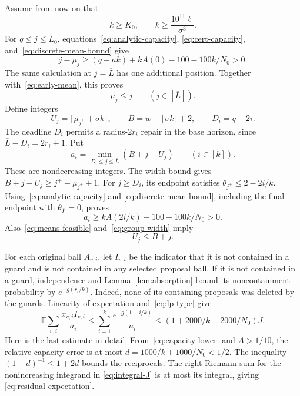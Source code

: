 \documentclass[11pt]{article}
\numberwithin{equation}{section}
\theoremstyle{definition}
\newcommand{\E}{\mathbb E}
\newcommand{\cL}{\overline L}
\begin{document}
Assume from now on that
\begin{equation}\label{eq:large-regime}
 k\ge K_0,\qquad k\ge\frac{10^{11}\ell}{\sigma^3}.
\end{equation}
For $q\le j\le L_0$, equations~\eqref{eq:analytic-capacity},
\eqref{eq:cert-capacity}, and~\eqref{eq:discrete-mean-bound} give
\[
 j-\mu_j\ge(q-ak)+kA(0)-100-100k/N_0>0.
\]
The same calculation at $j=\cL$ has one additional position.
Together with~\eqref{eq:early-mean}, this proves
\begin{equation}\label{eq:means-feasible}
 \mu_j\le j\qquad(j\in[\cL]).
\end{equation}
Define integers
\begin{equation}\label{eq:U-B}
 U_j=\lceil\mu_{j^+}+\sigma k\rceil,\qquad
 B=w+\lceil\sigma k\rceil+2,\qquad D_i=q+2i.
\end{equation}
The deadline $D_i$ permits a radius-$2r_i$ repair in the base horizon,
since $\cL-D_i=2r_i+1$. Put
\begin{equation}\label{eq:integer-capacities}
 a_i=\min_{D_i\le j\le\cL}(B+j-U_j)\qquad(i\in[k]).
\end{equation}
These are nondecreasing integers. The width bound gives
$B+j-U_j\ge j^+-\mu_{j^+}+1$.
For $j\ge D_i$, its endpoint satisfies
$\theta_{j^+}\le2-2i/k$. Using~\eqref{eq:analytic-capacity} and
\eqref{eq:discrete-mean-bound}, including the final endpoint with
$\theta_{\cL}=0$, proves
\begin{equation}\label{eq:capacity-lower}
 a_i\ge kA(2i/k)-100-100k/N_0>0.
\end{equation}
Also~\eqref{eq:means-feasible} and~\eqref{eq:group-width} imply
\begin{equation}\label{eq:U-feasible}
 U_j\le B+j.
\end{equation}

For each original ball $A_{v,i}$, let $I_{v,i}$ be the indicator that it
is not contained in a guard and is not contained in any selected
proposal ball. If it is not contained in a guard, independence and
Lemma~\ref{lem:absorption} bound its noncontainment probability by
$e^{-g(r_i/k)}$. Indeed, none of its containing proposals was deleted
by the guards. Linearity of expectation and~\eqref{eq:lp-type} give
\begin{equation}\label{eq:residual-expectation}
 \E\sum_{v,i}\frac{x_{v,i}I_{v,i}}{a_i}
 \le\sum_{i=1}^k\frac{e^{-g(1-i/k)}}{a_i}
 \le(1+2000/k+2000/N_0)J.
\end{equation}
Here is the last estimate in detail. From~\eqref{eq:capacity-lower}
and $A>1/10$, the relative capacity error is at most
$d=1000/k+1000/N_0<1/2$.
The inequality $(1-d)^{-1}\le1+2d$ bounds the reciprocals.
The right Riemann sum for the nonincreasing integrand in
\eqref{eq:integral-J} is at most its integral, giving
\eqref{eq:residual-expectation}.
\end{document}
